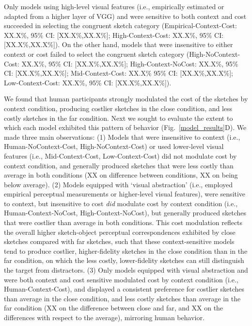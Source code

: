 \documentclass[9pt,twocolumn,twoside]{pnas-new}
\begin{document}
Only models using high-level visual features (i.e., empirically estimated or adapted from a higher layer of VGG) and were sensitive to both context and cost succeeded in selecting the congruent sketch category (Empirical-Context-Cost: XX.X\%, 95\% CI: [XX.X\%,XX.X\%]; High-Context-Cost: XX.X\%, 95\% CI: [XX.X\%,XX.X\%]). On the other hand, models that were insensitive to either context or cost failed to select the congruent sketch category (High-NoContext-Cost: XX.X\%, 95\% CI: [XX.X\%,XX.X\%]; High-Context-NoCost: XX.X\%, 95\% CI: [XX.X\%,XX.X\%]; Mid-Context-Cost: XX.X\% 95\% CI: [XX.X\%,XX.X\%]; Low-Context-Cost: XX.X\%, 95\% CI: [XX.X\%,XX.X\%]).

We found that human participants strongly modulated the cost of the sketches by context condition, producing costlier sketches in the close condition, and less costly sketches in the far condition. Next we sought to evaluate the extent to which each model exhibited this pattern of behavior (Fig.~\ref{model_results}D). We made three main observations: (1) Models that were insensitive to context (i.e., Human-NoContext-Cost, High-NoContext-Cost) or used lower-level visual features (i.e., Mid-Context-Cost, Low-Context-Cost) did not modulate cost by context condition, and generally produced sketches that were less costly than average in both conditions (XX on difference between conditions, XX on being below average). (2) Models equipped with `visual abstraction' (i.e., employed empirical perceptual measurements or higher-level visual features), were sensitive to context, but insensitive to cost \textit{did} modulate cost by context condition (i.e., Human-Context-NoCost, High-Context-NoCost), but generally produced sketches that were costlier than average in both conditions. This cost modulation reflects the overall higher sketch-object perceptual correspondences exhibited by close sketches compared with far sketches, such that these context-sensitive models tend to produce costlier, higher-fidelity sketches in the close condition than in the far condition, on which the less costly, lower-fidelity sketches can still distinguish the target from distractors. (3) Only models equipped with visual abstraction and were both context and cost sensitive modulated cost by context condition (i.e., Human-Context-Cost), and displayed a consistent preference for costlier sketches than average in the close condition, and less costly sketches than average in the far condition (XX on the difference between close and far, and XX on the differences with respect to the average), mirroring human behavior. 
\end{document}
